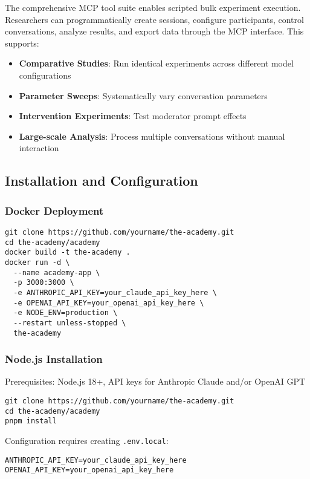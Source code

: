 \documentclass[11pt,letterpaper]{article}
\begin{document}
The comprehensive MCP tool suite enables scripted bulk experiment execution. Researchers can programmatically create sessions, configure participants, control conversations, analyze results, and export data through the MCP interface. This supports:

\begin{itemize}
    \item \textbf{Comparative Studies}: Run identical experiments across different model configurations
    \item \textbf{Parameter Sweeps}: Systematically vary conversation parameters
    \item \textbf{Intervention Experiments}: Test moderator prompt effects
    \item \textbf{Large-scale Analysis}: Process multiple conversations without manual interaction
\end{itemize}

\subsection{Installation and Configuration}

\subsubsection{Docker Deployment}
\begin{verbatim}
git clone https://github.com/yourname/the-academy.git
cd the-academy/academy
docker build -t the-academy .
docker run -d \
  --name academy-app \
  -p 3000:3000 \
  -e ANTHROPIC_API_KEY=your_claude_api_key_here \
  -e OPENAI_API_KEY=your_openai_api_key_here \
  -e NODE_ENV=production \
  --restart unless-stopped \
  the-academy
\end{verbatim}

\subsubsection{Node.js Installation}
Prerequisites: Node.js 18+, API keys for Anthropic Claude and/or OpenAI GPT

\begin{verbatim}
git clone https://github.com/yourname/the-academy.git
cd the-academy/academy
pnpm install
\end{verbatim}

Configuration requires creating \texttt{.env.local}:
\begin{verbatim}
ANTHROPIC_API_KEY=your_claude_api_key_here
OPENAI_API_KEY=your_openai_api_key_here
\end{verbatim}
\end{document}
